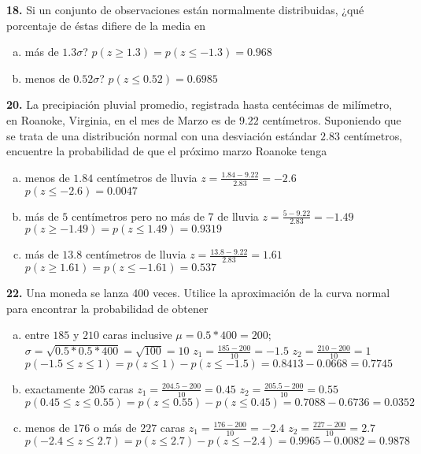 \documentclass[12pt, letterpaper]{article}
\begin{document}
    \textbf{18. }Si un conjunto de observaciones están normalmente distribuidas, ¿qué porcentaje de éstas difiere de la
    media en
    \begin{enumerate}[a)]
        \item más de $1.3\sigma$?\vskip0.5cm
        $p(z\geq 1.3)=p(z\leq -1.3)=0.968$
        \item menos de $0.52\sigma$?\vskip0.5cm
        $p(z\leq 0.52)=0.6985$
    \end{enumerate}\vskip1cm

    \textbf{20. }La precipiación pluvial promedio, registrada hasta centécimas de milímetro, en Roanoke, Virginia, en el
    mes de Marzo es de $9.22$ centímetros. Suponiendo que se trata de una distribución normal con una desviación estándar
    $2.83$ centímetros, encuentre la probabilidad de que el próximo marzo Roanoke tenga
    \begin{enumerate}[a)]
        \item menos de $1.84$ centímetros de lluvia\vskip0.5cm
        $z=\displaystyle\frac{1.84-9.22}{2.83}=-2.6$\vskip0.5cm
        $p(z\leq -2.6)=0.0047$
        \item más de $5$ centímetros pero no más de 7 de lluvia\vskip0.5cm
        $z=\displaystyle\frac{5-9.22}{2.83}=-1.49$\vskip0.5cm
        $p(z\geq -1.49)=p(z\leq 1.49)=0.9319$
        \item más de $13.8$ centímetros de lluvia\vskip0.5cm
        $z=\displaystyle\frac{13.8-9.22}{2.83}=1.61$\vskip0.5cm
        $p(z\geq 1.61)=p(z\leq -1.61)=0.537$
    \end{enumerate}\vskip1cm

    \textbf{22. }Una moneda se lanza 400 veces. Utilice la aproximación de la curva normal para encontrar la probabilidad
    de obtener
    \begin{enumerate}[a)]
        \item entre $185$ y $210$ caras inclusive\vskip0.5cm
        $\mu=0.5*400=200$; $\sigma=\sqrt{0.5*0.5*400}=\sqrt{100}=10$\vskip0.5cm
        $z_1=\displaystyle\frac{185-200}{10}=-1.5$\vskip0.5cm
        $z_2=\displaystyle\frac{210-200}{10}=1$\vskip0.5cm
        $p(-1.5\leq z\leq 1)=p(z\leq 1)-p(z\leq -1.5)=0.8413-0.0668=0.7745$
        \item exactamente $205$ caras\vskip0.5cm
        $z_1=\displaystyle\frac{204.5-200}{10}=0.45$\vskip0.5cm
        $z_2=\displaystyle\frac{205.5-200}{10}=0.55$\vskip0.5cm
        $p(0.45\leq z\leq 0.55)=p(z\leq 0.55)-p(z\leq 0.45)=0.7088-0.6736=0.0352$
        \item menos de $176$ o más de $227$ caras\vskip0.5cm
        $z_1=\displaystyle\frac{176-200}{10}=-2.4$\vskip0.5cm
        $z_2=\displaystyle\frac{227-200}{10}=2.7$\vskip0.5cm
        $p(-2.4\leq z\leq 2.7)=p(z\leq 2.7)-p(z\leq -2.4)=0.9965-0.0082=0.9878$
    \end{enumerate}\vskip1cm
\end{document}
